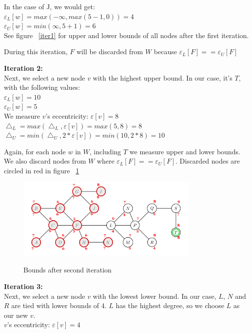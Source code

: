 \documentclass[12pt]{amsart}
\begin{document}
In the case of J, we would get:\\

$\varepsilon_L[w] = max(-\infty,max(5 - 1, 0)) = 4$\\
$\varepsilon_U[w] = min(\infty,5 + 1) = 6$\\

See figure ~\ref{iter1} for upper and lower bounds of all nodes after the first iteration.


During this iteration, $F$ will be discarded from $W$ because $\varepsilon_L[F] == \varepsilon_U[F]$


\textbf{Iteration 2:}\\
Next, we select a new node $v$ with the highest upper bound. In our case, it's $T$, with the following values:\\
$\varepsilon_L[w] = 10$\\
$\varepsilon_U[w] = 5$\\
We measure $v$'s eccentricity: $\varepsilon[v] = 8$\\
$\bigtriangleup_L = max(\bigtriangleup_L, \varepsilon[v]) = max(5, 8) = 8$ \\
$\bigtriangleup_U = min(\bigtriangleup_U, 2* \varepsilon[v]) = min(10, 2*8) = 10$

Again, for each node $w$ in $W$, including $T$ we measure upper and lower bounds. We also discard nodes from $W$ where $\varepsilon_L[F] == \varepsilon_U[F]$. Discarded nodes are circled in red in figure ~\ref{iter2}

\begin{figure}[h]
\caption{Bounds after second iteration}
\centering
\includegraphics[width=0.8\textwidth]{iter2.png}
\label{iter2}
\end{figure}

\textbf{Iteration 3:}\\
Next, we select a new node $v$ with the lowest lower bound. In our case, $L$, $N$ and $R$ are tied with lower bounds of 4. $L$ has the highest degree, so we choose $L$ as our new $v$.\\
$v$'s eccentricity: $\varepsilon[v] = 4$\\
\end{document}
